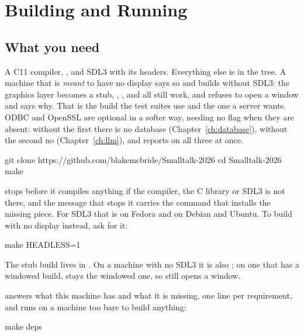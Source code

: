 \chapter{Building and Running}
\label{ch:building}


\section{What you need}

A C11 compiler, , and SDL3 with its headers. Everything else is in
the tree. A machine that is \emph{meant} to have no display says so and
builds without SDL3: the graphics layer becomes a stub, ,
,  and  all still work, and
 refuses to open a window and says why. That is the build
the test suites use and the one a server wants. ODBC and OpenSSL are
optional in a softer way, needing no flag when they are absent: without the
first there is no database (Chapter~\ref{ch:database}), without the second
no  (Chapter~\ref{ch:llm}), and  reports on all
three at once.

\begin{sh}
git clone https://github.com/blakemcbride/Smalltalk-2026
cd Smalltalk-2026
make
\end{sh}

 stops before it compiles anything if the compiler, the C library
or SDL3 is not there, and the message that stops it carries the command that
installs the missing piece. For SDL3 that is 
on Fedora and  on Debian and Ubuntu. To
build with no display instead, ask for it:

\begin{sh}
make HEADLESS=1
\end{sh}

The stub build lives in . On a machine with no
SDL3 it is also ; on one that has a windowed build,
 stays the windowed one, so  still opens a window.

 answers what this machine has and what it is missing, one
line per requirement, and runs on a machine too bare to build anything:

\begin{sh}
make deps
\end{sh}

